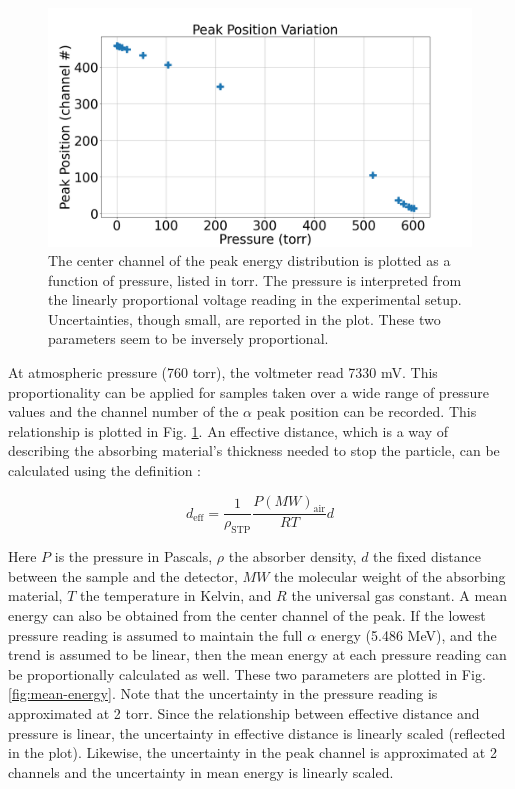 \begin{figure}
\centering
\includegraphics[width=\textwidth]{peak_position.png}
\caption{The center channel of the peak energy distribution is plotted as a function of pressure, listed in torr. The pressure is interpreted from the linearly proportional voltage reading in the experimental setup. Uncertainties, though small, are reported in the plot. These two parameters seem to be inversely proportional.}
\label{fig:peak-position}
\end{figure}

At atmospheric pressure (760 torr), the voltmeter read 7330 mV. This proportionality can be applied for samples taken over a wide range of pressure values and the channel number of the $\alpha$ peak position can be recorded. This relationship is plotted in Fig. \ref{fig:peak-position}. An effective distance, which is a way of describing the absorbing material’s thickness needed to stop the particle, can be calculated using the definition \cite{melissinos}:

\begin{equation}
d_{\mathrm{eff}} = \frac{1}{\rho_{\mathrm{STP}}} \frac{P(MW)_{\mathrm{air}}}{RT}d
\end{equation}

Here $P$ is the pressure in Pascals, $\rho$ the absorber density, $d$ the fixed distance between the sample and the detector, $MW$ the molecular weight of the absorbing material, $T$ the temperature in Kelvin, and $R$ the universal gas constant. A mean energy can also be obtained from the center channel of the peak. If the lowest pressure reading is assumed to maintain the full $\alpha$ energy (5.486 MeV), and the trend is assumed to be linear, then the mean energy at each pressure reading can be proportionally calculated as well. These two parameters are plotted in Fig. \ref{fig:mean-energy}. Note that the uncertainty in the pressure reading is approximated at 2 torr. Since the relationship between effective distance and pressure is linear, the uncertainty in effective distance is linearly scaled (reflected in the plot). Likewise, the uncertainty in the peak channel is approximated at 2 channels and the uncertainty in mean energy is linearly scaled.


